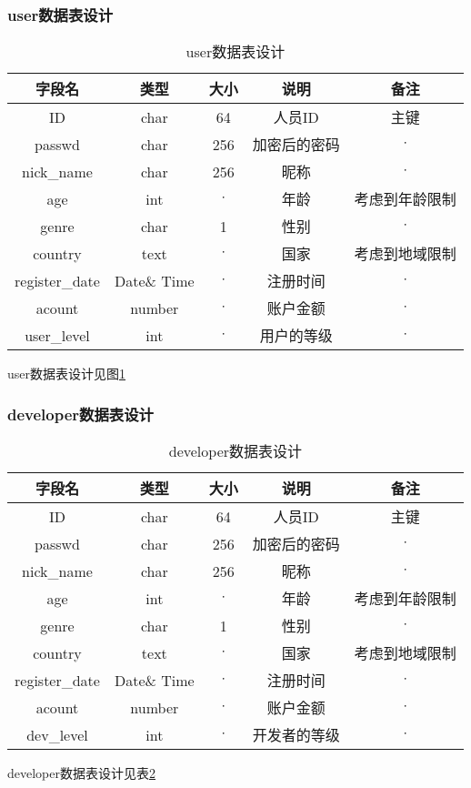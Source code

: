 \subsubsection{user数据表设计}
\begin{table}[htbp]
\centering
\caption{user数据表设计} \label{tab:user_database}
\begin{tabular}{|c|c|c|c|c|}
    \hline
    字段名 & 类型 & 大小 & 说明 & 备注 \\
    \hline
    ID & char & 64 & 人员ID & 主键 \\
    \hline
    passwd & char & 256 & 加密后的密码 & $\cdot$ \\
    \hline
    nick\_name & char & 256 & 昵称 & $\cdot$ \\
    \hline 
    age & int & $\cdot$ & 年龄 & 考虑到年龄限制 \\
    \hline
    genre & char & 1 & 性别 & $\cdot$ \\
    \hline
    country & text & $\cdot$ & 国家 & 考虑到地域限制 \\
    \hline
    register\_date & Date\& Time & $\cdot$ & 注册时间 & $\cdot$ \\
    \hline
    acount & number & $\cdot$ & 账户金额 & $\cdot$ \\
    \hline
    user\_level & int & $\cdot$ & 用户的等级 & $\cdot$ \\
    \hline
\end{tabular}
\end{table}
user数据表设计见图\ref{tab:user_database}

\subsubsection{developer数据表设计}
\begin{table}[htbp]
\centering
\caption{developer数据表设计} \label{tab:developer_database}
\begin{tabular}{|c|c|c|c|c|}
    \hline
    字段名 & 类型 & 大小 & 说明 & 备注 \\
    \hline
    ID & char & 64 & 人员ID & 主键 \\
    \hline
    passwd & char & 256 & 加密后的密码 & $\cdot$ \\
    \hline
    nick\_name & char & 256 & 昵称 & $\cdot$ \\
    \hline 
    age & int & $\cdot$ & 年龄 & 考虑到年龄限制 \\
    \hline
    genre & char & 1 & 性别 & $\cdot$ \\
    \hline
    country & text & $\cdot$ & 国家 & 考虑到地域限制 \\
    \hline
    register\_date & Date\& Time & $\cdot$ & 注册时间 & $\cdot$ \\
    \hline
    acount & number & $\cdot$ & 账户金额 & $\cdot$ \\
    \hline
    dev\_level & int & $\cdot$ & 开发者的等级 & $\cdot$ \\
    \hline
\end{tabular}
\end{table}
developer数据表设计见表\ref{tab:developer_database}

